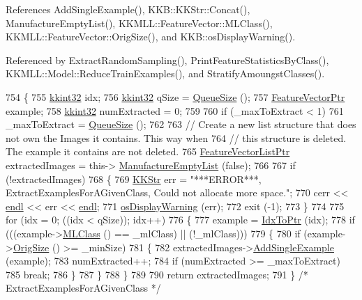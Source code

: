 References Add\+Single\+Example(), K\+K\+B\+::\+K\+K\+Str\+::\+Concat(), Manufacture\+Empty\+List(), K\+K\+M\+L\+L\+::\+Feature\+Vector\+::\+M\+L\+Class(), K\+K\+M\+L\+L\+::\+Feature\+Vector\+::\+Orig\+Size(), and K\+K\+B\+::os\+Display\+Warning().



Referenced by Extract\+Random\+Sampling(), Print\+Feature\+Statistics\+By\+Class(), K\+K\+M\+L\+L\+::\+Model\+::\+Reduce\+Train\+Examples(), and Stratify\+Amoungst\+Classes().


\begin{DoxyCode}
754 \{
755   \hyperlink{namespace_k_k_b_a8fa4952cc84fda1de4bec1fbdd8d5b1b}{kkint32}            idx;
756   \hyperlink{namespace_k_k_b_a8fa4952cc84fda1de4bec1fbdd8d5b1b}{kkint32}            qSize = \hyperlink{class_k_k_b_1_1_k_k_queue_a1dab601f75ee6a65d97f02bddf71c40d}{QueueSize} ();
757   \hyperlink{class_k_k_m_l_l_1_1_feature_vector}{FeatureVectorPtr}   example;
758   \hyperlink{namespace_k_k_b_a8fa4952cc84fda1de4bec1fbdd8d5b1b}{kkint32}            numExtracted = 0;
759 
760   \textcolor{keywordflow}{if}  (\_maxToExtract < 1)
761     \_maxToExtract = \hyperlink{class_k_k_b_1_1_k_k_queue_a1dab601f75ee6a65d97f02bddf71c40d}{QueueSize} ();
762 
763   \textcolor{comment}{// Create a new list structure that does not own the Images it contains.  This way when }
764   \textcolor{comment}{// this structure is deleted.  The example it contains are not deleted.}
765   \hyperlink{class_k_k_m_l_l_1_1_feature_vector_list}{FeatureVectorListPtr}  extractedImages = this->
      \hyperlink{class_k_k_m_l_l_1_1_feature_vector_list_af533da1b34e4123f4fcb1343d5f48e37}{ManufactureEmptyList} (\textcolor{keyword}{false});
766 
767   \textcolor{keywordflow}{if}  (!extractedImages)
768   \{
769     \hyperlink{class_k_k_b_1_1_k_k_str}{KKStr}  err = \textcolor{stringliteral}{"***ERROR***, ExtractExamplesForAGivenClass,  Could not allocate more space."};
770     cerr << \hyperlink{namespace_k_k_b_ad1f50f65af6adc8fa9e6f62d007818a8}{endl} << err << \hyperlink{namespace_k_k_b_ad1f50f65af6adc8fa9e6f62d007818a8}{endl};
771     \hyperlink{namespace_k_k_b_acf68123327314e60e8213d162c80883f}{osDisplayWarning} (err);
772     exit (-1);
773   \}
774 
775   \textcolor{keywordflow}{for}  (idx = 0; ((idx < qSize)); idx++)
776   \{
777     example = \hyperlink{class_k_k_b_1_1_k_k_queue_acce2bdd8b3327e38266cf198382cd852}{IdxToPtr} (idx);
778     \textcolor{keywordflow}{if}  (((example->\hyperlink{class_k_k_m_l_l_1_1_feature_vector_a3c8fe002c6e868f8c00059c004fb32fd}{MLClass} () == \_mlClass)  ||  (!\_mlClass)))
779     \{
780       \textcolor{keywordflow}{if}  (example->\hyperlink{class_k_k_m_l_l_1_1_feature_vector_a5ea23a16266bc34a289824042a836c06}{OrigSize} () >= \_minSize)
781       \{
782         extractedImages->\hyperlink{class_k_k_m_l_l_1_1_feature_vector_list_a4ca2b0e88a70a1cced22de55562c82a6}{AddSingleExample} (example);
783         numExtracted++;
784         \textcolor{keywordflow}{if}  (numExtracted >= \_maxToExtract)
785           \textcolor{keywordflow}{break};
786       \}
787     \}
788   \}
789 
790   \textcolor{keywordflow}{return}  extractedImages;
791 \}  \textcolor{comment}{/*  ExtractExamplesForAGivenClass  */}
\end{DoxyCode}
